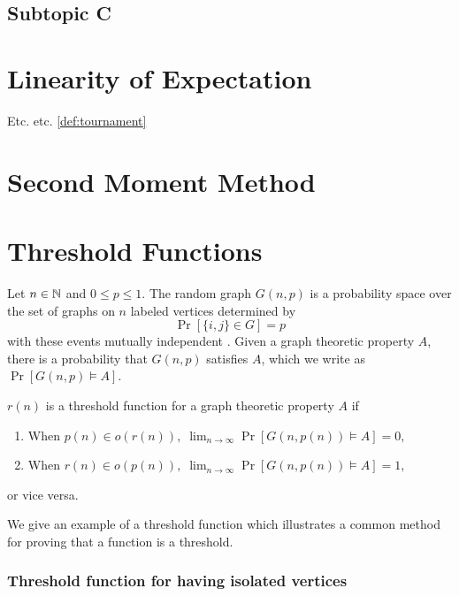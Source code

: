 \subsection{Subtopic C}\label{sec:litrev:theme1:C}

\section{Linearity of Expectation}\label{sec:litrev:theme2}

Etc. etc. \ref{def:tournament}

\section{Second Moment Method}

\section{Threshold Functions}

Let $n \in \mathbb{N}$ and $0 \leq p \leq 1$. The random graph $G(n, p)$ is a probability space over the set of graphs on $n$ labeled vertices determined by
\[\Pr[\{i, j\} \in G] = p\] 
with these events mutually independent \cite{alon2016probabilistic}. Given a graph theoretic property $A$, there is a probability that $G(n, p)$ satisfies $A$, which we write as $\Pr[G(n, p) \vDash A]$. 

\begin{definition}
    $r(n)$ is a threshold function for a graph theoretic property $A$ if 
    \begin{enumerate}
        \item When \(p(n) \in o(r(n)), \; \lim_{n \to \infty} \Pr[G(n, p(n)) \vDash A] = 0,\)
        \item When \(r(n) \in o(p(n)), \;  \lim_{n \to \infty} \Pr[G(n, p(n)) \vDash A] = 1,\) 
    \end{enumerate}
    or vice versa. \cite{alon2016probabilistic}
\end{definition}

We give an example of a threshold function which illustrates a common method for proving that a function is a threshold. \par

\subsubsection{Threshold function for having isolated vertices}

